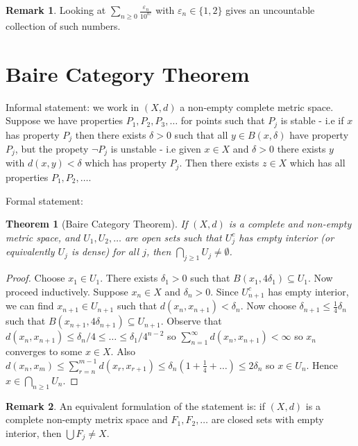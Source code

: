 \documentclass[a4paper, 10pt, twocolumn]{amsart}
\newtheorem*{theorem}{Theorem}
\theoremstyle{definition}
\newtheorem*{remark}{Remark}
\newcommand{\eps}[0]{\varepsilon}
\newcommand{\sbs}[0]{\subseteq}
\newcommand{\1}{\mathbbm{1}}
\begin{document}
\begin{remark}
    Looking at $\sum_{n\ge 0} \frac{\eps_n}{10^{n!}}$ with $\eps_n \in \{1,2\}$ gives an uncountable collection of such numbers.
\end{remark}





\section{Baire Category Theorem}

Informal statement: we work in $(X,d)$ a non-empty complete metric space. Suppose we have properties $P_1,P_2,P_3,\ldots$ for points such that $P_j$ is stable - i.e if $x$ has property $P_j$ then there exists $\delta>0$ such that all $y\in B(x,\delta)$ have property $P_j$, but the propety $\lnot P_j$ is unstable - i.e given $x\in X$ and $\delta>0$ there exists $y$ with $d(x,y) < \delta$ which has property $P_j$. Then there exists $z \in X$ which has all properties $P_1,P_2,\ldots$. 

Formal statement:

\begin{theorem}[Baire Category Theorem]
    If $(X,d)$ is a complete and non-empty metric space, and $U_1,U_2,\ldots$ are open sets such that $U_j^c$ has empty interior (or equivalently $U_j$ is dense) for all $j$, then $\bigcap_{j\ge 1} U_j \ne \emptyset$. 
\end{theorem}

\begin{proof}
    Choose $x_1 \in U_1$. There exists $\delta_1 > 0$ such that $B(x_1,4\delta_1) \sbs U_1$. Now proceed inductively. Suppose $x_n \in X$ and $\delta_n >0$. Since $U_{n+1}^c$ has empty interior, we can find $x_{n+1} \in U_{n+1}$ such that $d(x_n,x_{n+1}) < \delta_n$. Now choose $\delta_{n+1} \le \frac{1}{4} \delta_n$ such that $B(x_{n+1},4\delta_{n+1}) \sbs U_{n+1}$. Observe that $d(x_n,x_{n+1})  \le \delta_n/4 \le \ldots \le\delta_1/4^{n-2}$ so $\sum_{n=1}^\infty d(x_n,x_{n+1}) < \infty$ so $x_n$ converges to some $x \in X$. Also $d(x_n,x_m) \le \sum_{r=n}^{m-1} d(x_r,x_{r+1}) \le \delta_n\left(1+\frac{1}{4}+\ldots\right) \le 2\delta_n$ so $x \in U_n$. Hence $x \in \bigcap_{n\ge 1} U_n$.
\end{proof}

\begin{remark}
    An equivalent formulation of the statement is: if $(X,d)$ is a complete non-empty metrix space and $F_1,F_2,\ldots$ are closed sets with empty interior, then $\bigcup F_j \ne X$. 
\end{remark}
\end{document}
